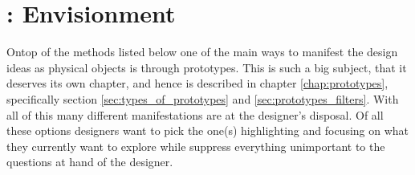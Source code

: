 \section{\todo : Envisionment} \label{sec:envisionment}
Ontop of the methods listed below one of the main ways to manifest the design ideas as physical objects is through prototypes. This is such a big subject, that it deserves its own chapter, and hence is described in chapter \ref{chap:prototypes}, specifically section \ref{sec:types_of_prototypes} and \ref{sec:prototypes_filters}. With all of this many different manifestations are at the designer's disposal. Of all these options designers want to pick the one(s) highlighting and focusing on what they currently want to explore while suppress everything unimportant to the questions at hand of the designer. \cite[p. 167]{benyon14}






